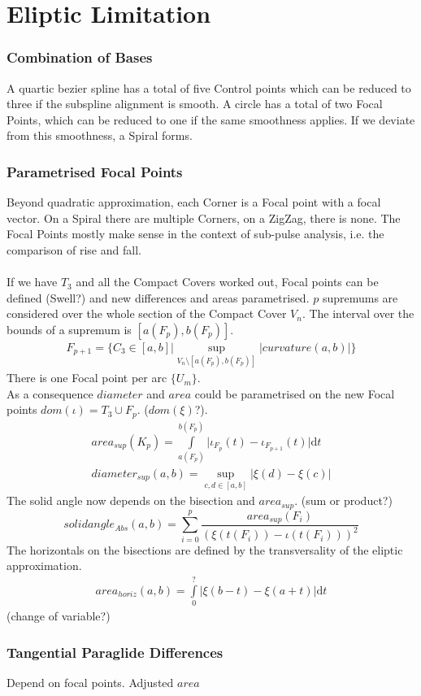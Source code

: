 \documentclass{report}
\begin{document}
\chapter{Eliptic Limitation}
\subsection{Combination of Bases}
A quartic bezier spline has a total of five Control points which can be reduced to three if the subspline alignment is smooth. A circle has a total of two Focal Points, which can be reduced to one if the same smoothness applies. If we deviate from this smoothness, a Spiral forms.
\subsection{Parametrised Focal Points}
Beyond quadratic approximation, each Corner is a Focal point with a focal vector. On a Spiral there are multiple Corners, on a ZigZag, there is none. The Focal Points mostly make sense in the context of sub-pulse analysis, i.e. the comparison of rise and fall.\\\\
If we have $T_{3}$ and all the Compact Covers worked out, Focal points can be defined (Swell?) and new differences and areas parametrised. $p$ supremums are considered over the whole section of the Compact Cover $V_{n}$. The interval over the bounds of a supremum is $[a(F_{p}),b(F_{p})]$.
\begin{align}
F_{p+1} = \{ C_{3} \in  [a,b]\vert \sup \limits _{V_{n} \setminus [a(F_{p}),b(F_{p})]} \lvert curvature(a,b) \rvert \}
\end{align}
There is one Focal point per arc $\{U_{m}\}$.\\
As a consequence $diameter$ and $area$ could be parametrised on the new Focal points $dom(\iota)=T_{3}\cup F_{p}$. ($dom(\xi)$?).\\
\begin{align}
area_{sup}(K_{p})=\int \limits _{a(F_{p})}^{b(F_{p})} \lvert \iota_{F_{p}}(t)-\iota_{F_{p+1}}(t) \rvert \mathrm{d}t\\
diameter_{sup}(a,b)=\sup \limits _{c,d \in [a,b]} \lvert \xi(d) - \xi(c) \rvert
\end{align}
The solid angle now depends on the bisection and $area_{sup}$. (sum or product?)
\begin{equation}
solidangle_{Abs}(a,b)=\sum \limits _{i=0}^{p} \frac{area_{sup}(F_{i})}{(\xi(t(F_{i}))-\iota(t(F_{i})))^2}
\end{equation}
The horizontals on the bisections are defined by the transversality of the eliptic approximation.
\begin{align}
area_{horiz}(a,b)=\int \limits _{0}^{?} \lvert \xi(b-t)-\xi(a+t) \rvert \mathrm{d}t
\end{align}
(change of variable?)
\subsection{Tangential Paraglide Differences}
Depend on focal points. Adjusted $area$

\printbibliography
\end{document}
